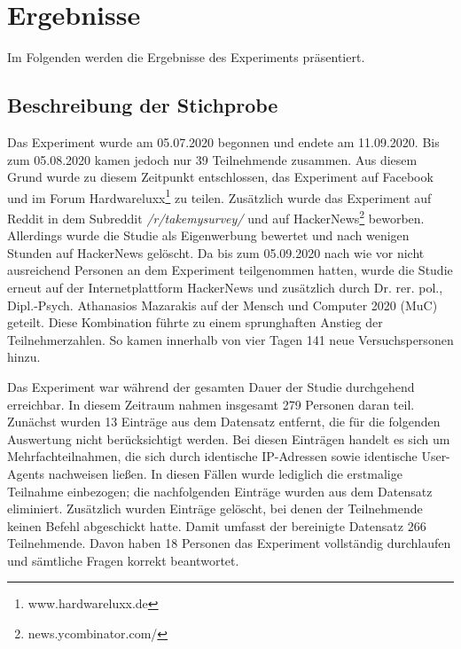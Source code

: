 \section{Ergebnisse}
Im Folgenden werden die Ergebnisse des Experiments präsentiert.

\subsection{Beschreibung der Stichprobe}\label{beschreibung}
Das Experiment wurde am 05.07.2020 begonnen und endete am 11.09.2020. Bis zum 05.08.2020 kamen jedoch nur 39 Teilnehmende zusammen. Aus diesem Grund wurde zu diesem Zeitpunkt entschlossen, das Experiment auf Facebook und im Forum Hardwareluxx\footnote{www.hardwareluxx.de} zu teilen. Zusätzlich wurde das Experiment auf Reddit in dem Subreddit \textit{/r/takemysurvey/} und auf HackerNews\footnote{news.ycombinator.com/} beworben. Allerdings wurde die Studie als Eigenwerbung bewertet und nach wenigen Stunden auf HackerNews gelöscht. Da bis zum 05.09.2020 nach wie vor nicht ausreichend Personen an dem Experiment teilgenommen hatten, wurde die Studie erneut auf der Internetplattform HackerNews und zusätzlich durch Dr. rer. pol., Dipl.-Psych. Athanasios Mazarakis auf der Mensch und Computer 2020 (MuC) geteilt. Diese Kombination führte zu einem sprunghaften Anstieg der Teilnehmerzahlen. So kamen innerhalb von vier Tagen 141 neue Versuchspersonen hinzu.

Das Experiment war während der gesamten Dauer der Studie durchgehend erreichbar. In diesem Zeitraum nahmen insgesamt 279 Personen daran teil. Zunächst wurden 13 Einträge aus dem Datensatz entfernt, die für die folgenden Auswertung nicht berücksichtigt werden. Bei diesen Einträgen handelt es sich um Mehrfachteilnahmen, die sich durch identische IP-Adressen sowie identische User-Agents nachweisen ließen. In diesen Fällen wurde lediglich die erstmalige Teilnahme einbezogen; die nachfolgenden Einträge wurden aus dem Datensatz eliminiert. Zusätzlich wurden Einträge gelöscht, bei denen der Teilnehmende keinen Befehl abgeschickt hatte. Damit umfasst der bereinigte Datensatz 266 Teilnehmende. Davon haben 18 Personen das Experiment vollständig durchlaufen und sämtliche Fragen korrekt beantwortet.

